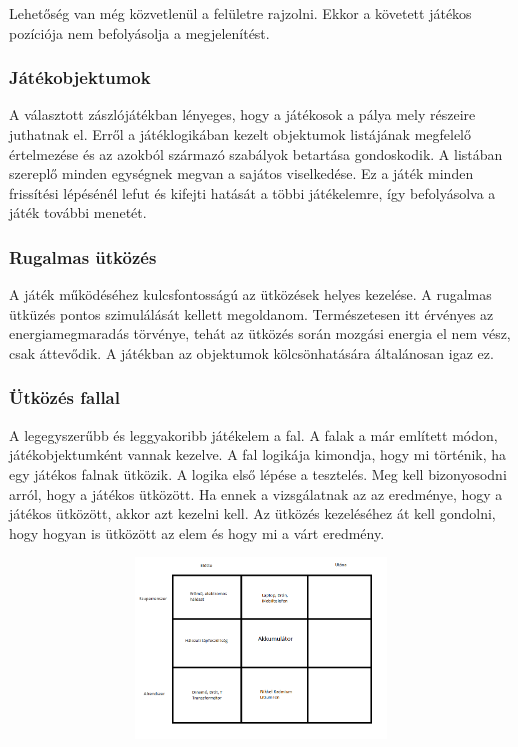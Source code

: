 \documentclass[bibliography=totocnumbered]{article}
\begin{document}
Lehetőség van még közvetlenül a felületre rajzolni. Ekkor a követett
játékos pozíciója nem befolyásolja a megjelenítést.


\subsubsection{Játékobjektumok}

A választott zászlójátékban lényeges, hogy a játékosok a pálya mely
részeire juthatnak el. Erről a játéklogikában kezelt objektumok
listájának megfelelő értelmezése és az azokból származó szabályok
betartása gondoskodik. A listában szereplő minden egységnek megvan a
sajátos viselkedése. Ez a játék minden frissítési lépésénél lefut és
kifejti hatását a többi játékelemre, így befolyásolva a játék további
menetét.


\subsubsection{Rugalmas ütközés}

A játék működéséhez kulcsfontosságú az ütközések helyes kezelése. A
rugalmas ütküzés pontos szimulálását kellett megoldanom. Természetesen
itt érvényes az energiamegmaradás törvénye, tehát az ütközés során
mozgási energia el nem vész, csak áttevődik. A játékban az objektumok
kölcsönhatására általánosan igaz ez.


\subsubsection{Ütközés fallal}

A legegyszerűbb és leggyakoribb játékelem a fal. A falak a már említett
módon, játékobjektumként vannak kezelve. A fal logikája kimondja, hogy
mi történik, ha egy játékos falnak ütközik. A logika első lépése a
tesztelés. Meg kell bizonyosodni arról, hogy a játékos ütközött. Ha
ennek a vizsgálatnak az az eredménye, hogy a játékos ütközött, akkor azt
kezelni kell. Az ütközés kezeléséhez át kell gondolni, hogy hogyan is
ütközött az elem és hogy mi a várt eredmény.

\includegraphics[width=5.51181in,height=1.89375in]{media/image3.png}
\end{document}
